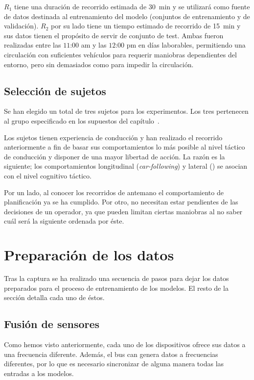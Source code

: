 $R_1$ tiene una duración de recorrido estimada de \SI{30}{\minute} y se utilizará como fuente de datos destinada al entrenamiento del modelo (conjuntos de entrenamiento y de validación). $R_2$ por su lado tiene un tiempo estimado de recorrido de \SI{15}{\minute} y sus datos tienen el propósito de servir de conjunto de test. Ambas fueron realizadas entre las $11$:$00$ am y las $12$:$00$ pm en días laborables, permitiendo una circulación con suficientes vehículos para requerir maniobras dependientes del entorno, pero sin demasiados como para impedir la circulación.

\subsection{Selección de sujetos}

Se han elegido un total de tres sujetos para los experimentos. Los tres pertenecen al grupo especificado en los supuestos del capítulo~.

Los sujetos tienen experiencia de conducción y han realizado el recorrido anteriormente a fin de basar sus comportamientos lo más posible al nivel táctico de conducción y disponer de una mayor libertad de acción. La razón es la siguiente; los comportamientos longitudinal (\textit{\gls{car-following}}) y lateral (\textit{}) se asocian con el nivel cognitivo táctico.

Por un lado, al conocer los recorridos de antemano el comportamiento de planificación ya se ha cumplido. Por otro, no necesitan estar pendientes de las decisiones de un operador, ya que pueden limitan ciertas maniobras al no saber cuál será la siguiente ordenada por éste.

\section{Preparación de los datos}

Tras la captura se ha realizado una secuencia de pasos para dejar los datos preparados para el proceso de entrenamiento de los modelos. El resto de la sección detalla cada uno de éstos.

\subsection{Fusión de sensores}

Como hemos visto anteriormente, cada uno de los dispositivos ofrece sus datos a una frecuencia diferente. Además, el bus \acrshort{can} genera datos a frecuencias diferentes, por lo que es necesario sincronizar de alguna manera todas las entradas a los modelos.

